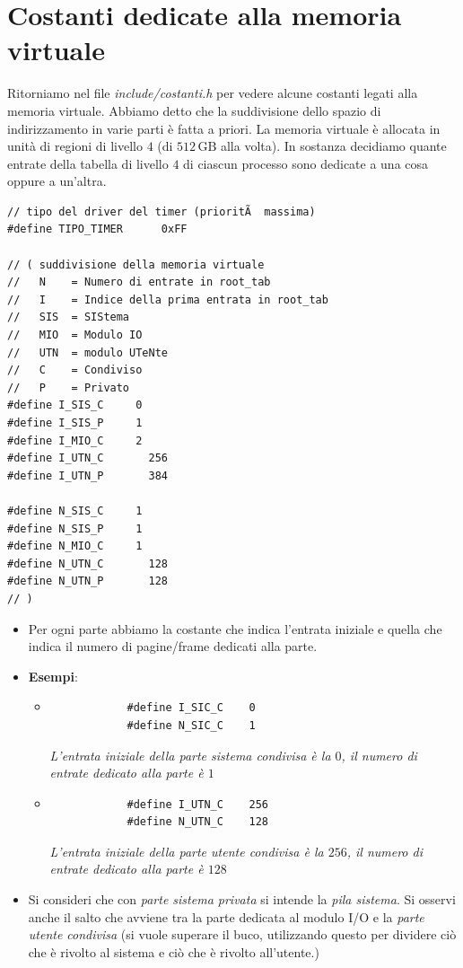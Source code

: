\documentclass[11pt]{report}
\theoremstyle{definition}
\begin{document}
\section{Costanti dedicate alla memoria virtuale}
Ritorniamo nel file \emph{include/costanti.h} per vedere alcune costanti legati alla memoria virtuale. Abbiamo detto che la suddivisione dello spazio di indirizzamento in varie parti è fatta a priori. La memoria virtuale è allocata in unità di regioni di livello $4$ (di $512\,\text{GB}$ alla volta). In sostanza decidiamo quante entrate della tabella di livello $4$ di ciascun processo sono dedicate a una cosa oppure a un'altra.
\begin{verbatim}
// tipo del driver del timer (prioritÃ  massima)
#define TIPO_TIMER		0xFF

// ( suddivisione della memoria virtuale
//   N    = Numero di entrate in root_tab
//   I	  = Indice della prima entrata in root_tab
//   SIS  = SIStema
//   MIO  = Modulo IO
//   UTN  = modulo UTeNte
//   C    = Condiviso
//   P    = Privato
#define I_SIS_C		0
#define I_SIS_P		1
#define I_MIO_C		2
#define I_UTN_C       256
#define I_UTN_P	      384

#define N_SIS_C		1
#define N_SIS_P		1
#define N_MIO_C		1
#define N_UTN_C	      128
#define N_UTN_P	      128 
// )
\end{verbatim}
\begin{itemize}
	\item Per ogni parte abbiamo la costante che indica l'entrata iniziale e quella che indica il numero di pagine/frame dedicati alla parte.
	\item \textbf{Esempi}:
	\begin{itemize}
		\item \begin{verbatim}
			#define I_SIC_C    0
			#define N_SIC_C    1
		\end{verbatim}
		\emph{L'entrata iniziale della parte sistema condivisa è la $0$, il numero di entrate dedicato alla parte è $1$}
		\item \begin{verbatim}
			#define I_UTN_C    256
			#define N_UTN_C    128
		\end{verbatim}
		\emph{L'entrata iniziale della parte utente condivisa è la $256$, il numero di entrate dedicato alla parte è $128$}
	\end{itemize}
	\item Si consideri che con \emph{parte sistema privata} si intende la \emph{pila sistema}. Si osservi anche il salto che avviene tra la parte dedicata al modulo I/O e la \emph{parte utente condivisa} (si vuole superare il buco, utilizzando questo per dividere ciò che è rivolto al sistema e ciò che è rivolto all'utente.)
\end{itemize}
\end{document}
